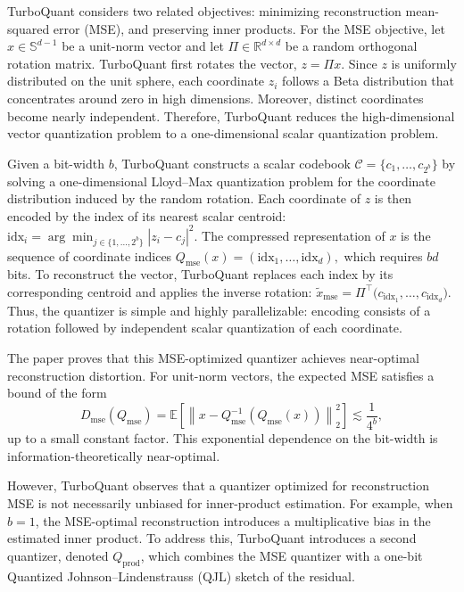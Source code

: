 \documentclass[sigconf]{acmart}
\begin{document}
TurboQuant considers two related objectives: minimizing reconstruction mean-squared error (MSE), and preserving inner products. 
For the MSE objective, let $x \in \mathbb{S}^{d-1}$ be a unit-norm vector and let $\Pi \in \mathbb{R}^{d \times d}$ be a random orthogonal rotation matrix. 
TurboQuant first rotates the vector,
\(
z = \Pi x .
\)
Since $z$ is uniformly distributed on the unit sphere, each coordinate $z_i$ follows a Beta distribution that concentrates around zero in high dimensions. 
Moreover, distinct coordinates become nearly independent. 
Therefore, TurboQuant reduces the high-dimensional vector quantization problem to a one-dimensional scalar quantization problem.

Given a bit-width $b$, TurboQuant constructs a scalar codebook 
\(
\mathcal{C}=\{c_1,\ldots,c_{2^b}\}
\)
by solving a one-dimensional Lloyd--Max quantization problem for the coordinate distribution induced by the random rotation. 
Each coordinate of $z$ is then encoded by the index of its nearest scalar centroid:
\(
\mathrm{idx}_i
=
\arg\min_{j \in \{1,\ldots,2^b\}}
|z_i-c_j|^2 .
\)
The compressed representation of $x$ is the sequence of coordinate indices
\(
Q_{\mathrm{mse}}(x)
=
(\mathrm{idx}_1,\ldots,\mathrm{idx}_d),
\)
which requires $bd$ bits. 
To reconstruct the vector, TurboQuant replaces each index by its corresponding centroid and applies the inverse rotation:
\(
\tilde{x}_{\mathrm{mse}}
=
\Pi^\top
\big(
c_{\mathrm{idx}_1},\ldots,c_{\mathrm{idx}_d}
\big).
\)
Thus, the quantizer is simple and highly parallelizable: encoding consists of a rotation followed by independent scalar quantization of each coordinate.

The paper proves that this MSE-optimized quantizer achieves near-optimal reconstruction distortion. 
For unit-norm vectors, the expected MSE satisfies a bound of the form
\[
D_{\mathrm{mse}}(Q_{\mathrm{mse}})
=
\mathbb{E}
\left[
\left\|
x-Q_{\mathrm{mse}}^{-1}(Q_{\mathrm{mse}}(x))
\right\|_2^2
\right]
\lesssim
\frac{1}{4^b},
\]
up to a small constant factor. 
This exponential dependence on the bit-width is information-theoretically near-optimal.

However, TurboQuant observes that a quantizer optimized for reconstruction MSE is not necessarily unbiased for inner-product estimation. 
For example, when $b=1$, the MSE-optimal reconstruction introduces a multiplicative bias in the estimated inner product. 
To address this, TurboQuant introduces a second quantizer, denoted $Q_{\mathrm{prod}}$, which combines the MSE quantizer with a one-bit Quantized Johnson--Lindenstrauss (QJL) sketch of the residual.
\end{document}
